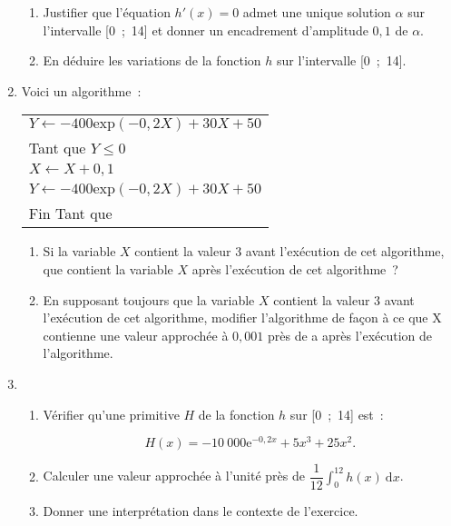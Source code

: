 \begin{enumerate}
\begin{center}
\begin{extern}
          \end{extern}
     \end{center}
     \begin{enumerate}[label=\alph*.]
          \item Justifier que l'équation $h'(x)= 0$ admet une unique solution $\alpha$ sur l'intervalle [0~;~14] et donner un encadrement d'amplitude $0,1$ de $\alpha$.
          \item  En déduire les variations de la fonction $h$ sur l'intervalle [0~;~14].
     \end{enumerate}
     \item Voici un algorithme~:
     \begin{center}
          \begin{extern}%
               \begin{tabularx}{0.5\linewidth}{|X|}\hline
                    $Y \gets -400 \text{exp}(- 0,2X) + 30X + 50$\\
                    Tant que $Y \leqslant 0$\\
                    \hspace{0.7cm}$X \gets X + 0,1$\\
                    \hspace{0.7cm}$Y \gets  -400 \text{exp}(- 0,2X)+ 30X +50$\\
                    Fin Tant que\\ \hline
               \end{tabularx}
          \end{extern}
     \end{center}
     \begin{enumerate}[label=\alph*.]
          \item Si la variable $X$ contient la valeur 3 avant l'exécution de cet algorithme, que contient la variable $X$ après l'exécution de cet algorithme~?
          \item En supposant toujours que la variable $X$ contient la valeur $3$ avant l'exécution de cet algorithme, modifier l'algorithme de façon à ce que X contienne une valeur approchée à $0,001$ près de a après l'exécution de l'algorithme.
     \end{enumerate}
     \item
     \begin{enumerate}[label=\alph*.]
          \item Vérifier qu'une primitive $H$ de la fonction $h$ sur [0~;~14] est~:
          \par
          \[H(x) = - 10~000 \text{e}^{- 0,2x} + 5x^3 + 25x^2.\]
          \item  Calculer une valeur approchée à l'unité près de
          $\dfrac{1}{12} \displaystyle\int_0^{12}  h(x)\:\text{d}x$.
          \item  Donner une interprétation dans le contexte de l'exercice.
     \end{enumerate}
\end{enumerate}
